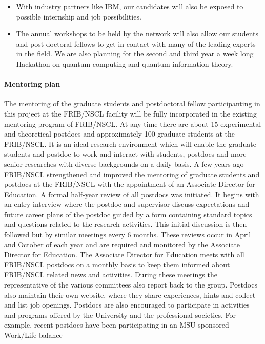 \documentclass[10pt]{article}
\begin{document}
\begin{itemize}
    \item With industry partners like IBM, our candidates will also be exposed to possible internship and job possibilities. 
    \item The annual workshops to be held by the network will also allow our students and post-doctoral fellows to get in contact with many of the leading experts in the field. We are also planning for the second and third year a week long Hackathon on quantum computing and quantum information theory.
\end{itemize}

\paragraph{Mentoring plan}


The mentoring of the graduate students and postdoctoral fellow 
participanting in this project at the 
FRIB/NSCL facility will be fully incorporated in the existing
mentoring program of FRIB/NSCL. At any time there are about 15
experimental and theoretical postdocs and approximately 100 graduate
students at the FRIB/NSCL. It is an ideal research environment which
will enable the graduate students and postdoc to work and interact
with students, postdocs and more senior researches with diverse
backgrounds on a daily basis. A few years ago FRIB/NSCL strengthened
and improved the mentoring of graduate students and postdocs at the
FRIB/NSCL with the appointment of an Associate Director for
Education. A formal half-year review of all postdocs was initiated. It
begins with an entry interview where the postdoc and supervisor
discuss expectations and future career plans of the postdoc guided by
a form containing standard topics and questions related to the
research activities. This initial discussion is then followed but by
similar meetings every 6 months. These reviews occur in April and
October of each year and are required and monitored by the Associate
Director for Education.  The Associate Director for Education meets
with all FRIB/NSCL postdocs on a monthly basis to keep them informed
about FRIB/NSCL related news and activities. During these meetings the
representative of the various committees also report back to the
group. Postdocs also maintain their own website, where they share
experiences, hints and collect and list job openings. Postdocs are
also encouraged to participate in activities and programs offered by
the University and the professional societies. For example, recent
postdocs have been participating in an MSU sponsored Work/Life balance
\end{document}
